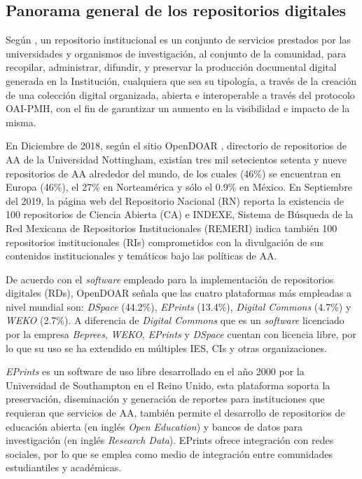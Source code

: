 \subsection{Panorama general de los repositorios digitales}


Según \cite{EcosistemasdelAA}, un repositorio institucional es un conjunto de servicios prestados por las universidades y organismos de investigación, al conjunto de la comunidad, para recopilar, administrar, difundir, y preservar la producción documental digital generada en la Institución, cualquiera que sea su tipología, a través de la creación de una colección digital organizada, abierta e interoperable a través del protocolo OAI-PMH, con el fin de garantizar un aumento en la visibilidad e impacto de la misma.\newline

En Diciembre de 2018, seg\'un el sitio OpenDOAR \cite{OpenDOAR}, directorio de repositorios de AA de la Universidad Nottingham, exist\'ian tres mil setecientos setenta y nueve repositorios de AA alrededor del mundo, de los cuales (46\%) se encuentran en Europa (46\%), el 27\% en Norteam\'erica y s\'olo el 0.9\% en M\'exico. En Septiembre del 2019, la p\'agina web del Repositorio Nacional (RN) \cite{RepositorioNacional} reporta la existencia de 100 repositorios de Ciencia Abierta (CA) e INDEXE, Sistema de B\'usqueda de la Red Mexicana de Repositorios Institucionales (REMERI) \cite{RI_REMERI} indica tambi\'en 100 repositorios institucionales (RIs) comprometidos con la divulgaci\'on de sus contenidos institucionales y tem\'aticos bajo las pol\'iticas de AA.\newline

De acuerdo con el \textit{software} empleado para la implementaci\'on de repositorios digitales (RDs), OpenDOAR \cite{OpenDOAR} se\~{n}ala que las cuatro plataformas m\'as empleadas a nivel mundial son: \textit{DSpace} \cite{DSpaceRef} (44.2\%), \textit{EPrints} (13.4\%), \textit{Digital Commons} (4.7\%) y \textit{WEKO} (2.7\%). A diferencia de \textit{Digital Commons} que es un \textit{software} licenciado por la empresa \textit{Beprees}, \textit{WEKO}, \textit{EPrints} y \textit{DSpace} cuentan con licencia libre, por lo que su uso se ha extendido en m\'ultiples IES, CIs y otras organizaciones.\newline

\textit{EPrints} \cite{EPrints} es un software de uso libre desarrollado en el a\~{n}o 2000 por la Universidad de Southampton en el Reino Unido, esta plataforma soporta la preservaci\'on, diseminaci\'on y generaci\'on de reportes para instituciones que requieran que servicios de AA, tambi\'en permite el desarrollo de repositorios de educaci\'on abierta (en ingl\'es \textit{Open Education}) y bancos de datos para investigaci\'on (en ingl\'es \textit{Research Data}). EPrints ofrece integraci\'on con redes sociales, por lo que se emplea como medio de integraci\'on entre comunidades estudiantiles y acad\'emicas.\newline

